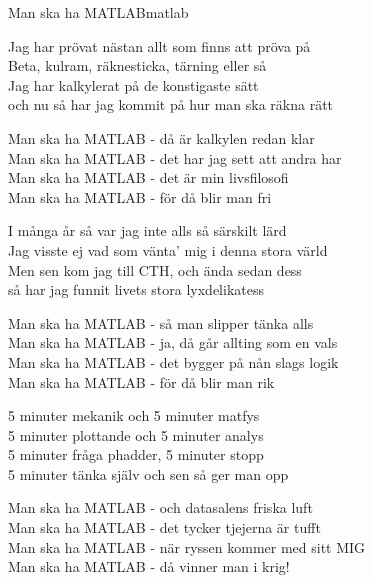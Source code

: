 \begin{song}{Man ska ha MATLAB}{matlab}
    \begin{vers}
    Jag har prövat nästan allt som finns att pröva på\\
    Beta, kulram, räknesticka, tärning eller så\\
    Jag har kalkylerat på de konstigaste sätt\\
    och nu så har jag kommit på hur man ska räkna rätt\\
    \end{vers}
    \begin{vers}
    Man ska ha MATLAB - då är kalkylen redan klar\\
    Man ska ha MATLAB - det har jag sett att andra har\\
    Man ska ha MATLAB - det är min livsfilosofi\\
    Man ska ha MATLAB - för då blir man fri\\
    \end{vers}
    \begin{vers}
    I många år så var jag inte alls så särskilt lärd\\
    Jag visste ej vad som vänta' mig i denna stora värld\\
    Men sen kom jag till CTH, och ända sedan dess\\
    så har jag funnit livets stora lyxdelikatess\\
    \end{vers}
    \begin{vers}
    Man ska ha MATLAB - så man slipper tänka alls\\
    Man ska ha MATLAB - ja, då går allting som en vals\\
    Man ska ha MATLAB - det bygger på nån slags logik\\
    Man ska ha MATLAB - för då blir man rik\\
    \end{vers}
    \begin{vers}
    5 minuter mekanik och 5 minuter matfys\\
    5 minuter plottande och 5 minuter analys\\
    5 minuter fråga phadder, 5 minuter stopp\\
    5 minuter tänka själv och sen så ger man opp\\
    \end{vers}
    \begin{vers}
    Man ska ha MATLAB - och datasalens friska luft\\
    Man ska ha MATLAB - det tycker tjejerna är tufft\\
    Man ska ha MATLAB - när ryssen kommer med sitt MIG\\
    Man ska ha MATLAB - då vinner man i krig!\\
    \end{vers}
    \end{song}